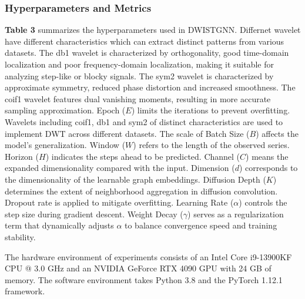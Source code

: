 \documentclass[final,12pt]{elsarticle}
\begin{document}
\subsubsection{Hyperparameters and Metrics}
\label{subsubsec-5.1.2}


\textbf{Table 3} summarizes the hyperparameters used in DWISTGNN.  %
Differnet wavelet have different characteristics 
which can extract distinct patterns from various datasets.
The db1 wavelet is characterized by orthogonality, good time-domain localization 
and poor frequency-domain localization, 
making it suitable for analyzing step-like or blocky signals.
The sym2 wavelet is characterized by approximate symmetry, 
reduced phase distortion and increased smoothness.
The coif1 wavelet features dual vanishing moments, 
resulting in more accurate sampling approximation.
Epoch ($E$) limits the iterations to prevent overfitting.  %
Wavelets including coif1, db1 and sym2 of distinct characteristics 
are used to implement DWT across different datasets.  %
The scale of Batch Size ($B$) affects the model's generalization.  %
Window ($W$) refers to the length of the observed series.  %
Horizon ($H$) indicates the steps ahead to be predicted.  %
Channel ($C$) means the expanded dimensionality compared with the input.  %
Dimension ($d$) corresponds to the dimensionality of the learnable graph embeddings.  %
Diffusion Depth ($K$) determines the extent of neighborhood aggregation 
in diffusion convolution.  %
Dropout rate is applied to mitigate overfitting.  %
Learning Rate ($\alpha$) controls the step size during gradient descent.  %
Weight Decay ($\gamma$) serves as a regularization term 
that dynamically adjusts $\alpha$ 
to balance convergence speed and training stability.  %


The hardware environment of experiments 
consists of an Intel Core i9-13900KF CPU @ 3.0 GHz and 
an NVIDIA GeForce RTX 4090 GPU with 24 GB of memory.  %
The software environment 
takes Python 3.8 and the PyTorch 1.12.1 framework.  %
\end{document}
